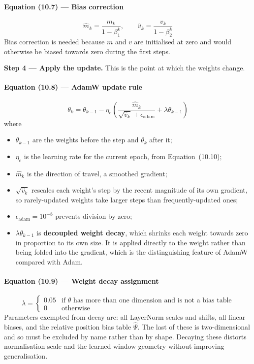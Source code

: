 \documentclass[12pt]{article}
\begin{document}
\paragraph{Equation (10.7) --- Bias correction}
\begin{equation}
\hat{m}_k = \frac{m_k}{1-\beta_1^k}, \qquad \hat{v}_k = \frac{v_k}{1-\beta_2^k}
\end{equation}
Bias correction is needed because $m$ and $v$ are initialised at zero and would otherwise be biased towards zero during the first steps.

\textbf{Step 4 --- Apply the update.} This is the point at which the weights change.

\paragraph{Equation (10.8) --- AdamW update rule}
\begin{equation}
\theta_k = \theta_{k-1} - \eta_e \left(\frac{\hat{m}_k}{\sqrt{\hat{v}_k} + \epsilon_{\mathrm{adam}}} + \lambda \theta_{k-1}\right)
\end{equation}
where
\begin{itemize}[nosep]
\item $\theta_{k-1}$ are the weights before the step and $\theta_k$ after it;
\item $\eta_e$ is the learning rate for the current epoch, from Equation~(10.10);
\item $\hat{m}_k$ is the direction of travel, a smoothed gradient;
\item $\sqrt{\hat{v}_k}$ rescales each weight's step by the recent magnitude of its own gradient, so rarely-updated weights take larger steps than frequently-updated ones;
\item $\epsilon_{\mathrm{adam}} = 10^{-8}$ prevents division by zero;
\item $\lambda \theta_{k-1}$ is \textbf{decoupled weight decay}, which shrinks each weight towards zero in proportion to its own size. It is applied directly to the weight rather than being folded into the gradient, which is the distinguishing feature of AdamW compared with Adam.
\end{itemize}

\paragraph{Equation (10.9) --- Weight decay assignment}
\begin{equation}
\lambda =
\begin{cases}
0.05 & \text{if } \theta \text{ has more than one dimension and is not a bias table} \\
0 & \text{otherwise}
\end{cases}
\end{equation}
Parameters exempted from decay are: all LayerNorm scales and shifts, all linear biases, and the relative position bias table $\widehat{\Psi}$. The last of these is two-dimensional and so must be excluded by name rather than by shape. Decaying these distorts normalisation scale and the learned window geometry without improving generalisation.
\end{document}
